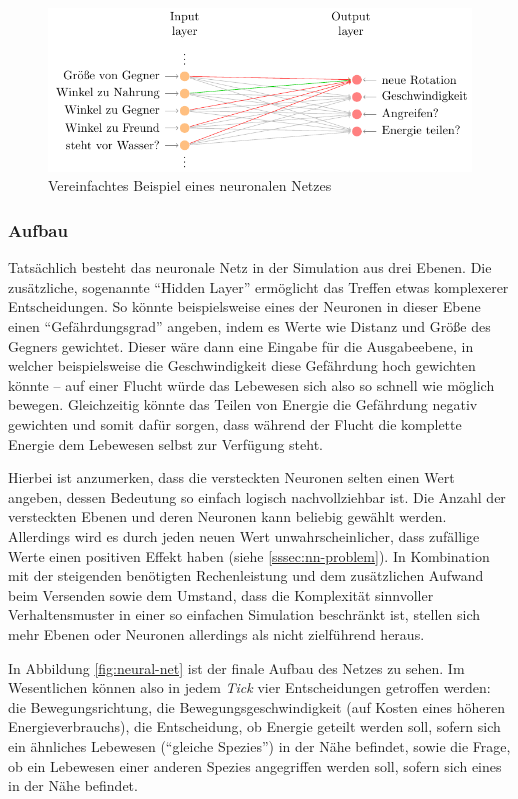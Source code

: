 \documentclass[course=erap]{aspdoc}
\begin{document}
\begin{figure}[H] %
    \centering
    \includegraphics[width=.9\textwidth]{res/nnexample.pdf}
    \caption{Vereinfachtes Beispiel eines neuronalen Netzes}
    \label{fig:nn-example}
\end{figure}

\subsubsection{Aufbau}
Tatsächlich besteht das neuronale Netz in der Simulation aus drei Ebenen. Die zusätzliche, sogenannte "`Hidden Layer"' ermöglicht das Treffen etwas komplexerer Entscheidungen. So könnte beispielsweise eines der Neuronen in dieser Ebene einen "`Gefährdungsgrad"' angeben, indem es Werte wie Distanz und Größe des Gegners gewichtet. Dieser wäre dann eine Eingabe für die Ausgabeebene, in welcher beispielsweise die Geschwindigkeit diese Gefährdung hoch gewichten könnte -- auf einer Flucht würde das Lebewesen sich also so schnell wie möglich bewegen. Gleichzeitig könnte das Teilen von Energie die Gefährdung negativ gewichten und somit dafür sorgen, dass während der Flucht die komplette Energie dem Lebewesen selbst zur Verfügung steht.

Hierbei ist anzumerken, dass die versteckten Neuronen selten einen Wert angeben, dessen Bedeutung so einfach logisch nachvollziehbar ist. Die Anzahl der versteckten Ebenen und deren Neuronen kann beliebig gewählt werden. Allerdings wird es durch jeden neuen Wert unwahrscheinlicher, dass zufällige Werte einen positiven Effekt haben (siehe \ref{sssec:nn-problem}). In Kombination mit der steigenden benötigten Rechenleistung und dem zusätzlichen Aufwand beim Versenden sowie dem Umstand, dass die Komplexität sinnvoller Verhaltensmuster in einer so einfachen Simulation beschränkt ist, stellen sich mehr Ebenen oder Neuronen allerdings als nicht zielführend heraus.

In Abbildung \ref{fig:neural-net} ist der finale Aufbau des Netzes zu sehen. Im Wesentlichen können also in jedem \emph{Tick} vier Entscheidungen getroffen werden: die Bewegungsrichtung, die Bewegungsgeschwindigkeit (auf Kosten eines höheren Energieverbrauchs), die Entscheidung, ob Energie geteilt werden soll, sofern sich ein ähnliches Lebewesen ("`gleiche Spezies"') in der Nähe befindet, sowie die Frage, ob ein Lebewesen einer anderen Spezies angegriffen werden soll, sofern sich eines in der Nähe befindet.
\end{document}
